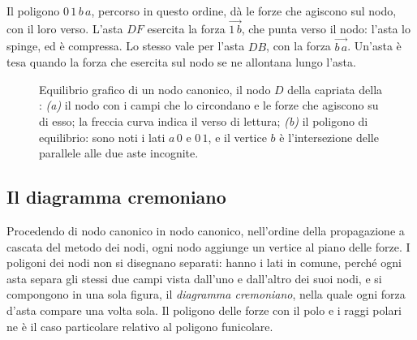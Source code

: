 Il poligono $0\,1\,b\,a$, percorso in questo ordine, dà le forze che agiscono
sul nodo, con il loro verso. L'asta $DF$ esercita la forza $\overrightarrow{1\,b}$, che
punta verso il nodo: l'asta lo spinge, ed è compressa. Lo stesso vale per l'asta $DB$, con la
forza $\overrightarrow{b\,a}$. Un'asta è tesa quando la forza che esercita sul
nodo se ne allontana lungo l'asta.

\begin{figure}[htbp]
	\centering
	\caption{Equilibrio grafico di un nodo canonico, il nodo $D$ della capriata della
		: \emph{(a)} il nodo con i campi che lo circondano e le forze che
		agiscono su di esso; la freccia curva indica il verso di lettura; \emph{(b)} il poligono di
		equilibrio: sono noti i lati $a\,0$ e $0\,1$, e il vertice $b$ è
		l'intersezione delle parallele alle due aste incognite.}
	\label{fig:nodo_canonico_sgr}
\end{figure}

\subsection{Il diagramma cremoniano}
\label{sec:cremoniano_sgr}

Procedendo di nodo canonico in nodo canonico, nell'ordine della propagazione a cascata del metodo
dei nodi, ogni nodo aggiunge un vertice al piano delle forze. I poligoni dei nodi non si disegnano
separati: hanno i lati in comune, perché ogni asta separa gli stessi due campi vista dall'uno e
dall'altro dei suoi nodi, e si compongono in una sola figura, il \emph{diagramma cremoniano},
nella quale ogni forza d'asta compare una volta sola. Il poligono delle forze con il polo e i
raggi polari ne è il caso particolare relativo al poligono funicolare.

